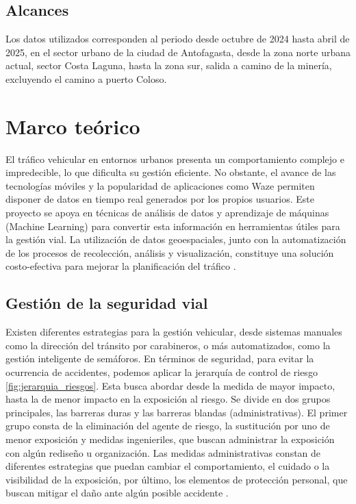 \documentclass[12pt]{article}
\begin{document}
\subsection{Alcances}

Los datos utilizados corresponden al periodo desde octubre de 2024 hasta abril de 2025, en el sector urbano de la ciudad de Antofagasta, desde la zona norte urbana actual, sector Costa Laguna, hasta la zona sur, salida a camino de la minería, excluyendo el camino a puerto Coloso.


\section{Marco teórico}

El tráfico vehicular en entornos urbanos presenta un comportamiento complejo e impredecible, lo que dificulta su gestión eficiente. No obstante, el avance de las tecnologías móviles y la popularidad de aplicaciones como Waze permiten disponer de datos en tiempo real generados por los propios usuarios. Este proyecto se apoya en técnicas de análisis de datos y aprendizaje de máquinas (Machine Learning) para convertir esta información en herramientas útiles para la gestión vial. La utilización de datos geoespaciales, junto con la automatización de los procesos de recolección, análisis y visualización, constituye una solución costo-efectiva para mejorar la planificación del tráfico \citep{barcelo2005}.

\subsection{Gestión de la seguridad vial}

Existen diferentes estrategias para la gestión vehicular, desde sistemas manuales como la dirección del tránsito por carabineros, o más automatizados, como la gestión inteligente de semáforos. En términos de seguridad, para evitar la ocurrencia de accidentes, podemos aplicar la jerarquía de control de riesgo \cref{fig:jerarquia_riesgos}. Esta busca abordar desde la medida de mayor impacto, hasta la de menor impacto en la exposición al riesgo. Se divide en dos grupos principales, las barreras duras y las barreras blandas (administrativas). El primer grupo consta de la eliminación del agente de riesgo, la sustitución por uno de menor exposición y medidas ingenieriles, que buscan administrar la exposición con algún rediseño u organización. Las medidas administrativas constan de diferentes estrategias que puedan cambiar el comportamiento, el cuidado o la visibilidad de la exposición, por último, los elementos de protección personal, que buscan mitigar el daño ante algún posible accidente \citep{niosh2024}.
\end{document}

